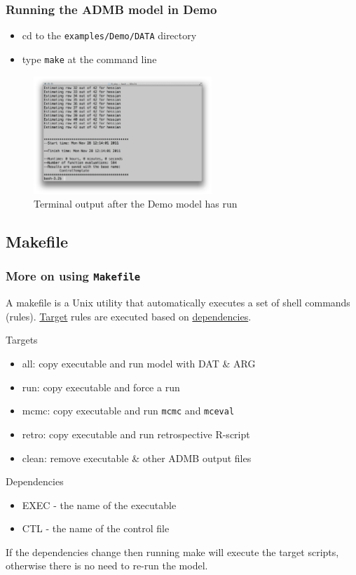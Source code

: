 \begin{frame}
	\frametitle{Running the ADMB model in Demo}
	\begin{itemize}
		\item cd to the \texttt{examples/Demo/DATA} directory
		\item type \texttt{make} at the command line
	\end{itemize}
	\begin{figure}[htbp]
		\centering
			\includegraphics[height=1.75in]{screenCaptures/Term-catage.pdf}
		\caption{Terminal output after the Demo model has run}
		\label{fig:screenCaptures_Term-catage}
	\end{figure}
	
\end{frame}


\subsection{Makefile} %
\label{sub:makefile}
\begin{frame}[shrink=10]
	\frametitle{More on using \texttt{Makefile} }
	A makefile is a Unix utility that automatically executes a set of shell commands (rules). \underline{Target} rules are executed based on \underline{dependencies}.
	
	\begin{block}{Targets}
		\begin{itemize}
			\item all:  copy executable and run model with DAT \& ARG
			\item run:  copy executable and force a run
			\item mcmc: copy executable and run \texttt{mcmc} and \texttt{mceval}
			\item retro: copy executable and run retrospective R-script
			\item clean: remove executable \& other ADMB output files
		\end{itemize}
	\end{block}
	
	\begin{block}{Dependencies}
		\begin{itemize}
			\item EXEC - the name of the executable
			\item CTL - the name of the control file
		\end{itemize}
	\end{block}
	If the dependencies change then running make will execute the target scripts, otherwise there is no need to re-run the model.
\end{frame}

